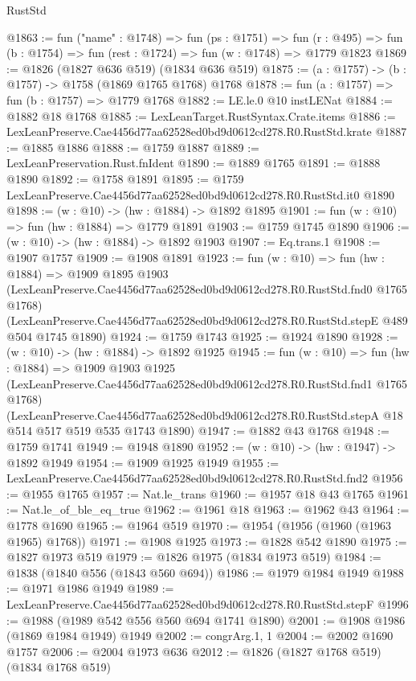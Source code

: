 \begin{lexlean}{RustStd}
\begin{coremodule}
@1863 := fun ("name" : @1748) =>
  fun (ps : @1751) =>
  fun (r : @495) => fun (b : @1754) => fun (rest : @1724) => fun (w : @1748) => @1779 @1823
@1869 := @1826 (@1827 @636 @519) (@1834 @636 @519)
@1875 := (a : @1757) -> (b : @1757) -> @1758 (@1869 @1765 @1768) @1768
@1878 := fun (a : @1757) => fun (b : @1757) => @1779 @1768
@1882 := LE.le.{0} @10 instLENat
@1884 := @1882 @18 @1768
@1885 := LexLeanTarget.RustSyntax.Crate.items
@1886 := LexLeanPreserve.Cae4456d77aa62528ed0bd9d0612cd278.R0.RustStd.krate
@1887 := @1885 @1886
@1888 := @1759 @1887
@1889 := LexLeanPreservation.Rust.fnIdent
@1890 := @1889 @1765
@1891 := @1888 @1890
@1892 := @1758 @1891
@1895 := @1759 LexLeanPreserve.Cae4456d77aa62528ed0bd9d0612cd278.R0.RustStd.it0 @1890
@1898 := (w : @10) -> (hw : @1884) -> @1892 @1895
@1901 := fun (w : @10) => fun (hw : @1884) => @1779 @1891
@1903 := @1759 @1745 @1890
@1906 := (w : @10) -> (hw : @1884) -> @1892 @1903
@1907 := Eq.trans.{1}
@1908 := @1907 @1757
@1909 := @1908 @1891
@1923 := fun (w : @10) =>
  fun (hw : @1884) =>
  @1909
    @1895
    @1903
    (LexLeanPreserve.Cae4456d77aa62528ed0bd9d0612cd278.R0.RustStd.fnd0 @1765 @1768)
    (LexLeanPreserve.Cae4456d77aa62528ed0bd9d0612cd278.R0.RustStd.stepE @489 @504 @1745 @1890)
@1924 := @1759 @1743
@1925 := @1924 @1890
@1928 := (w : @10) -> (hw : @1884) -> @1892 @1925
@1945 := fun (w : @10) =>
  fun (hw : @1884) =>
  @1909
    @1903
    @1925
    (LexLeanPreserve.Cae4456d77aa62528ed0bd9d0612cd278.R0.RustStd.fnd1 @1765 @1768)
    (LexLeanPreserve.Cae4456d77aa62528ed0bd9d0612cd278.R0.RustStd.stepA
      @18
      @514
      @517
      @519
      @535
      @1743
      @1890)
@1947 := @1882 @43 @1768
@1948 := @1759 @1741
@1949 := @1948 @1890
@1952 := (w : @10) -> (hw : @1947) -> @1892 @1949
@1954 := @1909 @1925 @1949
@1955 := LexLeanPreserve.Cae4456d77aa62528ed0bd9d0612cd278.R0.RustStd.fnd2
@1956 := @1955 @1765
@1957 := Nat.le_trans
@1960 := @1957 @18 @43 @1765
@1961 := Nat.le_of_ble_eq_true
@1962 := @1961 @18
@1963 := @1962 @43
@1964 := @1778 @1690
@1965 := @1964 @519
@1970 := @1954 (@1956 (@1960 (@1963 @1965) @1768))
@1971 := @1908 @1925
@1973 := @1828 @542 @1890
@1975 := @1827 @1973 @519
@1979 := @1826 @1975 (@1834 @1973 @519)
@1984 := @1838 (@1840 @556 (@1843 @560 @694))
@1986 := @1979 @1984 @1949
@1988 := @1971 @1986 @1949
@1989 := LexLeanPreserve.Cae4456d77aa62528ed0bd9d0612cd278.R0.RustStd.stepF
@1996 := @1988 (@1989 @542 @556 @560 @694 @1741 @1890)
@2001 := @1908 @1986 (@1869 @1984 @1949) @1949
@2002 := congrArg.{1, 1}
@2004 := @2002 @1690 @1757
@2006 := @2004 @1973 @636
@2012 := @1826 (@1827 @1768 @519) (@1834 @1768 @519)

\end{coremodule}
\end{lexlean}
